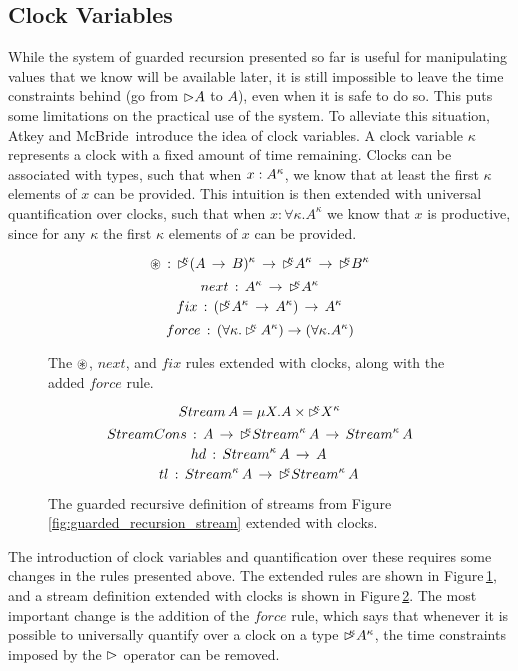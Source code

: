 \subsection{Clock Variables}
While the system of guarded recursion presented so far is useful for manipulating values that we know will be available later, it is still impossible to leave the time constraints behind (go from $\rhd A$ to $A$), even when it is safe to do so. This puts some limitations on the practical use of the system. To alleviate this situation, Atkey and McBride\,\citep{Atkey:2013} introduce the idea of clock variables. A clock variable $\kappa$ represents a clock with a fixed amount of time remaining. Clocks can be associated with types, such that when $x : A^\kappa$, we know that at least the first $\kappa$ elements of $x$ can be provided. This intuition is then extended with universal quantification over clocks, such that when $x : \forall\kappa. A^\kappa$ we know that $x$ is productive, since for any $\kappa$ the first $\kappa$ elements of $x$ can be provided. 
\begin{figure}
\[
\tensor \, :\, \laterk{(A\, \rightarrow \, B)}\, \rightarrow \, \laterk{A}\, \rightarrow \, \laterk{B}
\]
\[
next \, :\, A^\kappa \, \rightarrow \, \rhd^{\!\!\!\kappa}A^\kappa
\]
\[
fix\, :\, (\rhd^{\!\!\!\kappa}A^\kappa\, \rightarrow \, A^\kappa)\, \rightarrow \, A^\kappa
\]
\[
force \, :\, (\forall\kappa.\rhd^{\!\!\!\kappa}A^\kappa) \rightarrow (\forall\kappa.A^\kappa)
\]
\caption{The $\circledast$, $next$, and $fix$ rules extended with clocks, along with the added $force$ rule.}
\label{fig:guarded_recursion_rules_clocks}
\end{figure}
\begin{figure}
\[
Stream\,A = \mu X. A \times \rhd^{\!\!\!\kappa}X^\kappa
\]
\[
StreamCons\, :\, A\, \rightarrow \, \rhd^{\!\!\!\kappa}Stream^\kappa\, A\, \rightarrow \, Stream^\kappa\, A
\]
\[
hd \, : \, Stream^\kappa\,A\, \rightarrow \, A \, 
\]
\[
tl \, : \, Stream^\kappa\, A\, \rightarrow \,\rhd^{\!\!\!\kappa}Stream^\kappa\, A \, 
\]
\caption{The guarded recursive definition of streams from Figure\,\ref{fig:guarded_recursion_stream} extended with clocks.}
\label{fig:guarded_recursion_stream_clocks}
\end{figure}
The introduction of clock variables and quantification over these requires some changes in the rules presented above. The extended rules are shown in Figure\,\ref{fig:guarded_recursion_rules_clocks}, and a stream definition extended with clocks is shown in Figure\,\ref{fig:guarded_recursion_stream_clocks}. The most important change is the addition of the $force$ rule, which says that whenever it is possible to universally quantify over a clock on a type $\rhd^{\!\!\!\kappa}A^\kappa$, the time constraints imposed by the $\rhd$ operator can be removed.
